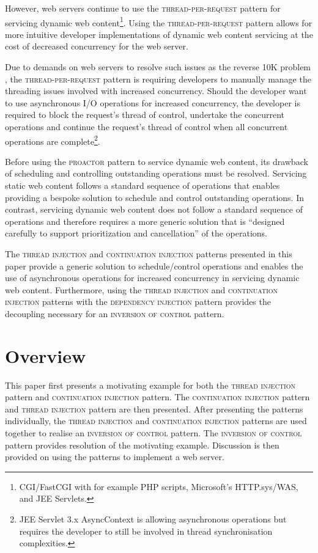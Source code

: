\documentclass[prodmode]{style/acmlarge}
\begin{document}
However, web servers continue to use the \textsc{thread-per-request} pattern for
servicing dynamic web content\footnote{CGI/FastCGI with for example PHP scripts,
Microsoft's HTTP.sys/WAS, and JEE Servlets.}.  Using the
\textsc{thread-per-request} pattern allows for more intuitive developer
implementations of dynamic web content servicing at the cost of decreased
concurrency for the web server.

Due to demands on web servers to resolve such issues as the reverse 10K problem
\cite{reverse-ten-k-problem}, the \textsc{thread-per-request} pattern is
requiring developers to manually manage the threading issues involved with
increased concurrency.  Should the developer want to use asynchronous I/O
operations for increased concurrency, the developer is required to block the
request's thread of control, undertake the concurrent operations and continue
the request's thread of control when all concurrent operations are
complete\footnote{JEE Servlet 3.x AsyncContext is allowing asynchronous
operations but requires the developer to still be involved in thread
synchronisation complexities.}.

Before using the \textsc{proactor} pattern to service dynamic web content, its
drawback of scheduling and controlling outstanding operations \cite[p.
8]{proactor} must be resolved.  Servicing static web content follows a standard
sequence of operations that enables providing a bespoke solution to schedule and
control outstanding operations.  In contrast, servicing dynamic web content does
not follow a standard sequence of operations and therefore requires a more
generic solution that is ``designed carefully to support prioritization and
cancellation'' \cite[p. 8]{proactor} of the operations.

The \textsc{thread injection} and \textsc{continuation injection} patterns
presented in this paper provide a generic solution to schedule/control
operations and enables the use of asynchronous operations for increased
concurrency in servicing dynamic web content.  Furthermore, using the
\textsc{thread injection} and \textsc{continuation injection} patterns with the
\textsc{dependency injection} pattern \cite{ioc} provides the decoupling
necessary for an \textsc{inversion of control} pattern.


\section{Overview}

This paper first presents a motivating example for both the \textsc{thread
injection} pattern and \textsc{continuation injection} pattern.  The
\textsc{continuation injection} pattern and \textsc{thread injection} pattern
are then presented.  After presenting the patterns individually, the
\textsc{thread injection} and \textsc{continuation injection} patterns are used
together to realise an \textsc{inversion of control} pattern.  The
\textsc{inversion of control} pattern provides resolution of the motivating
example.  Discussion is then provided on using the patterns to implement a web
server.
\end{document}
